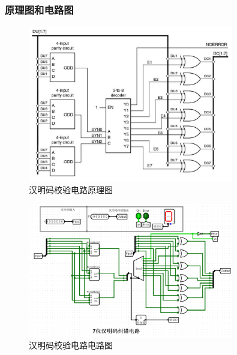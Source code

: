 \documentclass{article}
\begin{document}
    \subsubsection{原理图和电路图}
    \begin{figure}[H]
    \centering
    \includegraphics[width=0.8\textwidth]{5.4.1.png}
    \caption{汉明码校验电路原理图}
    \end{figure}

    \begin{figure}[H]
    \centering
    \includegraphics[width=0.8\textwidth]{5.4.2.png}
    \caption{汉明码校验电路电路图}
    \end{figure}
\end{document}
